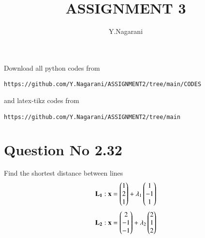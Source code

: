 \documentclass[journal,12pt,twocolumn]{IEEEtran}
\begin{document}
     \def\rightbox#1{\makebox[0in][r]{#1}}
     \def\centbox#1{\makebox[0in]{#1}}
     \def\topbox#1{\raisebox{-\baselineskip}[0in][0in]{#1}}
     \def\midbox#1{\raisebox{-0.5\baselineskip}[0in][0in]{#1}}
\vspace{3cm}
\title{ASSIGNMENT 3}
\author{Y.Nagarani}
\maketitle
\newpage
\bigskip
\renewcommand{\thefigure}{\theenumi}
\renewcommand{\thetable}{\theenumi}
Download all python codes from 
\begin{lstlisting}
https://github.com/Y.Nagarani/ASSIGNMENT2/tree/main/CODES
\end{lstlisting}
%
and latex-tikz codes from 
%
\begin{lstlisting}
https://github.com/Y.Nagarani/ASSIGNMENT2/tree/main
\end{lstlisting}
%
\section{Question No 2.32}
Find the shortest distance between lines 
\begin{align}
\mathbf{L_1}:  \mathbf{x} = \begin{pmatrix}1 \\ 2 \\ 1\end{pmatrix} + \lambda_1\begin{pmatrix}1 \\ -1 \\ 1\end{pmatrix}
\end{align}
\begin{align}
\mathbf{L_2}:  \mathbf{x} = \begin{pmatrix}2 \\ -1 \\ -1\end{pmatrix} + \lambda_2\begin{pmatrix}2 \\ 1 \\ 2\end{pmatrix}
\end{align}
\end{document}
